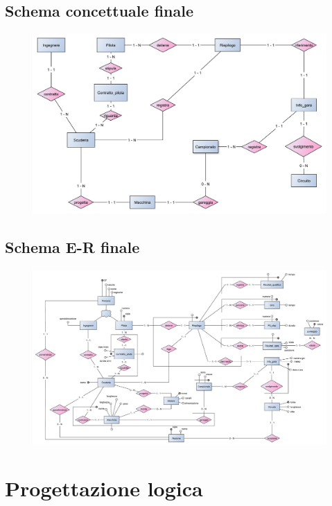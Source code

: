\documentclass[a4paper,12pt]{report}
\begin{document}
		\section{Schema concettuale finale}
		\begin{figure}[htbp]
			\centering
			\includegraphics[scale=0.8]{copies/scheletrone.pdf}
		\end{figure}
		\section{Schema E-R finale}
		\begin{figure}[htbp]
			\centering
			\includegraphics[scale=0.8]{copies/ERfinale.pdf}
		\end{figure}

	\chapter{Progettazione logica}
\end{document}
